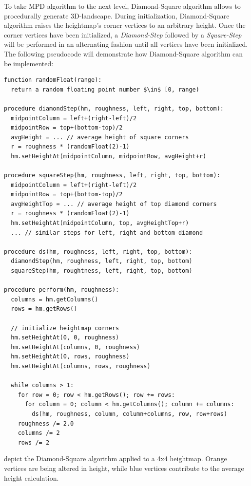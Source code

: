 \documentclass[11pt,a4paper,twoside,openright]{report}
\begin{document}
\noindent To take MPD algorithm to the next level, Diamond-Square algorithm allows to procedurally generate 3D-landscape. During initialization, Diamond-Square algorithm raises the heightmap's corner vertices to an arbitrary height. Once the corner vertices have been initialized, a \emph{Diamond-Step} followed by a \emph{Square-Step} will be performed in an alternating fashion until all vertices have been initialized. The following pseudocode will demonstrate how Diamond-Square algorithm can be implemented:

\begin{lstlisting}[caption=DS pseudocode, mathescape=true]
function randomFloat(range):
  return a random floating point number $\in$ [0, range)

procedure diamondStep(hm, roughness, left, right, top, bottom):
  midpointColumn = left+(right-left)/2
  midpointRow = top+(bottom-top)/2
  avgHeight = ... // average height of square corners
  r = roughness * (randomFloat(2)-1)
  hm.setHeightAt(midpointColumn, midpointRow, avgHeight+r)

procedure squareStep(hm, roughness, left, right, top, bottom):
  midpointColumn = left+(right-left)/2
  midpointRow = top+(bottom-top)/2
  avgHeightTop = ... // average height of top diamond corners
  r = roughness * (randomFloat(2)-1)
  hm.setHeightAt(midpointColumn, top, avgHeightTop+r)
  ... // similar steps for left, right and bottom diamond

procedure ds(hm, roughness, left, right, top, bottom):
  diamondStep(hm, roughness, left, right, top, bottom)
  squareStep(hm, roughtness, left, right, top, bottom)

procedure perform(hm, roughness):
  columns = hm.getColumns()
  rows = hm.getRows()

  // initialize heightmap corners
  hm.setHeightAt(0, 0, roughness)
  hm.setHeightAt(columns, 0, roughness)
  hm.setHeightAt(0, rows, roughness)
  hm.setHeightAt(columns, rows, roughness)

  while columns > 1:
    for row = 0; row < hm.getRows(); row += rows:
      for column = 0; column < hm.getColumns(); column += columns:
        ds(hm, roughness, column, column+columns, row, row+rows)
    roughness /= 2.0
    columns /= 2
    rows /= 2
\end{lstlisting}

\noindent {} depict the Diamond-Square algorithm applied to a 4x4 heightmap. Orange vertices are being altered in height, while blue vertices contribute to the average height calculation.
\end{document}
